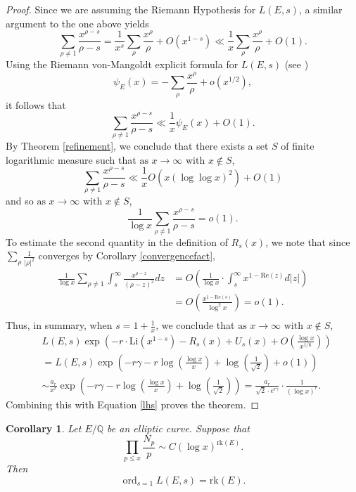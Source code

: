 \documentclass[12pt,reqno]{amsart}
\newtheorem{corollary}[theorem]{Corollary}
\theoremstyle{definition}
\numberwithin{equation}{section}
\newcommand{\rk}{\mathrm{rk}}
\newcommand{\Li}{\mathrm{Li}}
\newcommand{\ord}{\mathop{\mathrm{ord}}}
\renewcommand{\Re}{\mathrm{Re}}
\begin{document}
\begin{proof}
Since we are assuming the Riemann Hypothesis for $L(E, s)$, a similar argument to the one above yields
$$
\sum_{\rho \neq 1} \frac{x^{\rho-s}}{\rho-s}=\frac{1}{x^s} \sum_{\rho} \frac{x^\rho}{\rho}+O(x^{1-s}) \ll \frac{1}{x} \sum_{\rho} \frac{x^\rho}{\rho} +O(1). 
$$
Using the Riemann von-Mangoldt explicit formula for $L(E, s)$ (see  \cite[Equation 1.10]{Rubenstein 2013})
$$
\psi_E(x) =- \sum_{\rho} \frac{x^{\rho}}{\rho}+o(x^{1/2}), 
$$
it follows that 
$$
\sum_{\rho \neq 1} \frac{x^{\rho-s}}{\rho-s} \ll \frac{1}{x} \psi_E(x)+O(1). 
$$
By Theorem \ref{refinement}, we conclude that there exists a set $S$ of finite logarithmic measure such that $\text{as }   x \rightarrow \infty \text{ with } x \not \in S$, 
$$
\sum_{\rho \neq 1} \frac{x^{\rho-s}}{\rho-s} \ll \frac{1}{x} O( x (\log \log x)^2)+O(1) 
$$
and so $\text{as }   x \rightarrow \infty \text{ with } x \not \in S$, 
$$
\frac{1}{\log x} \sum_{\rho \neq 1} \frac{x^{\rho-s}}{\rho-s}  =o(1). 
$$
To estimate the second quantity in the definition of $R_s(x)$, we note that since $\sum \limits_{\rho} \frac{1}{|\rho|^2}$ converges by Corollary \ref{convergencefact}, 
\begin{align*}
\frac{1}{\log x} \sum_{\rho \neq 1} \int_{s}^{\infty} \frac{x^{\rho-z}}{(\rho-z)^2}dz &= O \left(\frac{1}{\log x} \cdot \int_ {s}^{\infty}  x^{1-\Re(z) } d|z| \right) \\
&= O \left ( \frac{x^{1 -\textrm{Re}(s)}}{\log^2 x}  \right) 
=o(1).  \\ 
\end{align*}
 Thus, in summary, when $s=1+\frac{1}{x}$, we conclude that $\text{as }   x \rightarrow \infty \text{ with } x \not \in S$, 
\begin{align*}
  & L(E, s)    \exp   \left (-r \cdot \Li(x^{1-s}) -R_s(x) 
+  U_s(x) +  O \left ( \frac{\log x}{x^{1/6}} \right) \right)  \\
& = L(E, s)  \exp \left ( -r\gamma - r \log \left (\frac{\log x}{x} \right )+ \log \left( \frac{1}{\sqrt 2} \right)+ o(1) \right ) \\
& \sim  \frac{a_r}{x^r} \exp \left (  -r\gamma -r \log \left (\frac{\log x}{x} \right)+ \log \left( \frac{1}{\sqrt 2} \right) \right) 
 = \frac{a_r}{\sqrt 2 \cdot e^{r \gamma} } \cdot \frac{1}{ (\log x)^r}. 
\end{align*}
Combining this with Equation \eqref{lhs} proves the theorem. 
\end{proof}






\begin{corollary} \label{cor2} 
Let $E/\mathbb Q$ be an elliptic curve. Suppose that $$\prod_{p \leq x} \frac{N_p}{p}  \sim C (\log x)^{\rk (E) }.$$ Then 
$$
\ord_{s=1} L(E, s)= \rk (E). 
$$

\end{corollary}
\end{document}
